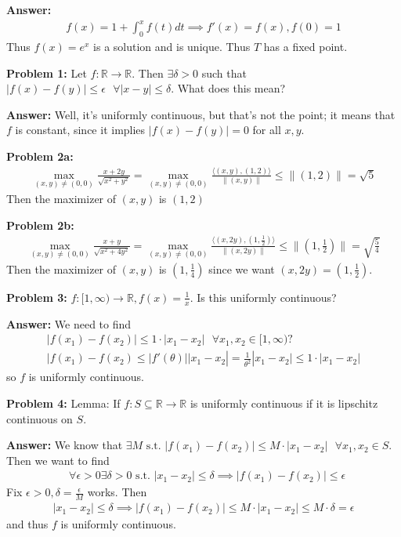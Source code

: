 \documentclass{article}
\newcommand*{\txt}[1]{\text{ #1 }}%
\newcommand*{\iprod}[1]{\langle #1 \rangle}
\newcommand*{\fora}{\txt{}\forall}%
\newcommand*{\rr}{\mathbb{R}}%
\begin{document}
\textbf{Answer:} \begin{align*}
    f(x)=1+\int_{0}^{x}f(t)dt\implies f'(x)=f(x),f(0)=1
\end{align*} Thus $f(x)=e^x$ is a solution and is unique. Thus $T$ has a fixed point.

\textbf{Problem 1:} Let $f:\rr\to\rr$. Then $\exists \delta>0$ such that $|f(x)-f(y)|\leq \epsilon\fora |x-y|\leq \delta$. What does this mean? 

\textbf{Answer:} Well, it's uniformly continuous, but that's not the point; it means that $f$ is constant, since it implies $|f(x)-f(y)|=0$ for all $x,y$.

\textbf{Problem 2a:} \begin{align*}
    \max_{(x,y)\neq (0,0)}\frac{x+2y}{\sqrt{x^2+y^2}}=\max_{(x,y)\neq (0,0)}\frac{\iprod{(x,y),(1,2)}}{\|(x,y)\|}\leq \| (1,2)\|=\sqrt{5}
\end{align*} Then the maximizer of $(x,y)$ is $(1,2)$

\textbf{Problem 2b:} \begin{align*}
    \max_{(x,y)\neq (0,0)}\frac{x+y}{\sqrt{x^2+4y^2}}=\max_{(x,y)\neq (0,0)}\frac{\iprod{(x,2y),(1,\frac{1}{2})}}{\|(x,2y)\|}\leq \|(1,\frac{1}{2})\|=\sqrt{\frac{5}{4}}
\end{align*} Then the maximizer of $(x,y)$ is $(1,\frac{1}{4})$ since we want $(x,2y)=(1,\frac{1}{2})$.

\textbf{Problem 3:} $f:[1,\infty)\to\rr,f(x)=\frac{1}{x}$. Is this uniformly continuous? 

\textbf{Answer:} We need to find \begin{align*}
    |f(x_1)-f(x_2)|\leq 1\cdot|x_1-x_2|\fora x_1,x_2\in [1,\infty)?\\
    |f(x_1)-f(x_2)\leq |f'(\theta)||x_1-x_2|=\frac{1}{\theta^2}|x_1-x_2|\leq 1\cdot |x_1-x_2|
\end{align*} so $f$ is uniformly continuous.

\textbf{Problem 4:} Lemma: If $f:S\subseteq \rr\to\rr$ is uniformly continuous if it is lipschitz continuous on $S$.

\textbf{Answer:} We know that $\exists M\txt{s.t.}|f(x_1)-f(x_2)|\leq M\cdot|x_1-x_2|\fora x_1,x_2\in S$. Then we want to find \begin{align*}
    \fora \epsilon>0\exists \delta>0\txt{s.t.}|x_1-x_2|\leq \delta\implies |f(x_1)-f(x_2)|\leq \epsilon
\end{align*} Fix $\epsilon>0,\delta=\frac{\epsilon}{M}$ works. Then \begin{align*}
    |x_1-x_2|\leq \delta\implies |f(x_1)-f(x_2)|\leq M\cdot |x_1-x_2|\leq M\cdot \delta=\epsilon
\end{align*} and thus $f$ is uniformly continuous.
\end{document}

